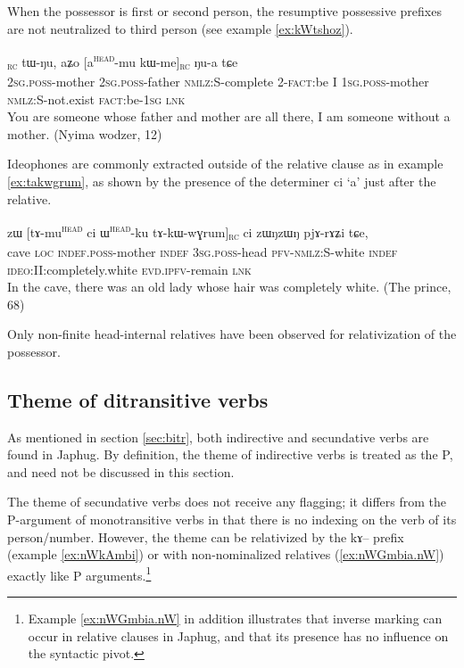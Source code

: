 \documentclass[oldfontcommands,oneside,a4paper,11pt]{article}
\newcommand{\ipa}[1]{{\phon #1}} %
\newcommand{\tete}{\textsuperscript{\textsc{head}}}
\newcommand{\rc}{\textsubscript{\textsc{rc}}}
\begin{document}
When the possessor is   first or second person,  the resumptive possessive prefixes  are not neutralized to third person (see example \ref{ex:kWtshoz}).
        \begin{exe}
   \ex \label{ex:kWtshoz}
 \gll 
[\ipa{nɤ}\tete{}-\ipa{mu}   	\ipa{nɤ}\tete{}-\ipa{wa}   	\ipa{kɯ-tsʰoz}]\rc{}   	\ipa{tɯ-ŋu,}   	\ipa{aʑo}   	[\ipa{a}\tete{}-\ipa{mu}   	\ipa{kɯ-me}]\rc{}   	\ipa{ŋu-a}   	\ipa{tɕe}    \\
\textsc{2sg.poss}-mother \textsc{2sg.poss}-father \textsc{nmlz:S}-complete 2-\textsc{fact:}be I \textsc{1sg.poss}-mother \textsc{nmlz:S}-not.exist \textsc{fact:}be-\textsc{1sg} \textsc{lnk} \\
\glt You are someone whose father and mother are all there, I am someone without a mother. (Nyima wodzer, 12)
\end{exe}

Ideophones are commonly extracted outside of the relative clause as in example \ref{ex:takwgrum}, as shown by the presence of the determiner \ipa{ci} `a' just after the relative.

     \begin{exe}
   \ex \label{ex:takwgrum}
 \gll \ipa{praʁkʰaŋ}   	\ipa{zɯ}   	[\ipa{tɤ-mu}\tete{}   	\ipa{ci}   	\ipa{ɯ}\tete{}-\ipa{ku}   	\ipa{tɤ-kɯ-wɣrum}]\rc{}   	 	\ipa{ci} \ipa{zɯŋzɯŋ}    	\ipa{pjɤ-rɤʑi}   	\ipa{tɕe,}        \\
cave \textsc{loc} \textsc{indef.poss}-mother \textsc{indef} \textsc{3sg.poss}-head \textsc{pfv-nmlz:}S-white \textsc{indef} \textsc{ideo}:II:completely.white \textsc{evd.ipfv}-remain \textsc{lnk}  \\
\glt In the cave, there was an old lady whose hair was completely white. (The prince, 68)
\end{exe}

 
Only non-finite head-internal relatives have been observed for relativization of the possessor.
% 

\subsection{Theme of ditransitive verbs}  \label{sec:second}
As mentioned in section \ref{sec:bitr}, both indirective and secundative verbs are found in Japhug. By definition, the theme of indirective verbs is treated as the P, and need not be discussed in this section.

The theme of secundative verbs does not receive  any flagging; it differs from the P-argument of monotransitive verbs in that there is no indexing on the verb of its person/number. However, the theme can be relativized by the \ipa{kɤ}-- prefix (example \ref{ex:nWkAmbi}) or with non-nominalized relatives (\ref{ex:nWGmbia.nW}) exactly like P arguments.\footnote{Example \ref{ex:nWGmbia.nW} in addition illustrates that inverse marking can occur in relative clauses in Japhug, and that its presence has no influence on the syntactic pivot.}
\end{document}

